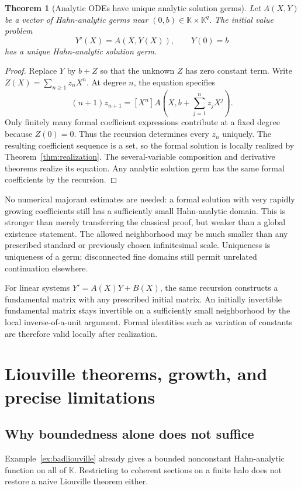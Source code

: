 \documentclass[11pt,a4paper]{article}
\newtheorem{theorem}{Theorem}[section]
\theoremstyle{definition}\newtheorem{definition}[theorem]{Definition}
\theoremstyle{remark}\newtheorem{remark}[theorem]{Remark}
\newcommand{\K}{\mathbb K}
\numberwithin{equation}{section}
\begin{document}
\begin{theorem}[Analytic ODEs have unique analytic solution germs]\label{thm:ODE}
Let $A(X,Y)$ be a vector of Hahn-analytic germs near $(0,b)\in\K\times\K^q$. The initial value problem
\[
 Y'(X)=A(X,Y(X)),\qquad Y(0)=b
\]
has a unique Hahn-analytic solution germ.
\end{theorem}
\begin{proof}
Replace $Y$ by $b+Z$ so that the unknown $Z$ has zero constant term. Write $Z(X)=\sum_{n\geq1}z_nX^n$. At degree $n$, the equation specifies
\[
 (n+1)z_{n+1}=[X^n]A\left(X,b+\sum_{j=1}^{n}z_jX^j\right).
\]
Only finitely many formal coefficient expressions contribute at a fixed degree because $Z(0)=0$. Thus the recursion determines every $z_n$ uniquely. The resulting coefficient sequence is a set, so the formal solution is locally realized by Theorem~\ref{thm:realization}. The several-variable composition and derivative theorems realize its equation. Any analytic solution germ has the same formal coefficients by the recursion.
\end{proof}
No numerical majorant estimates are needed: a formal solution with very rapidly growing coefficients still has a sufficiently small Hahn-analytic domain. This is stronger than merely transferring the classical proof, but weaker than a global existence statement. The allowed neighborhood may be much smaller than any prescribed standard or previously chosen infinitesimal scale. Uniqueness is uniqueness of a germ; disconnected fine domains still permit unrelated continuation elsewhere.

For linear systems $Y'=A(X)Y+B(X)$, the same recursion constructs a fundamental matrix with any prescribed initial matrix. An initially invertible fundamental matrix stays invertible on a sufficiently small neighborhood by the local inverse-of-a-unit argument. Formal identities such as variation of constants are therefore valid locally after realization.

\section{Liouville theorems, growth, and precise limitations}\label{sec:limits}

\subsection{Why boundedness alone does not suffice}
Example~\ref{ex:badliouville} already gives a bounded nonconstant Hahn-analytic function on all of $\K$. Restricting to coherent sections on a finite halo does not restore a naive Liouville theorem either.
\end{document}
